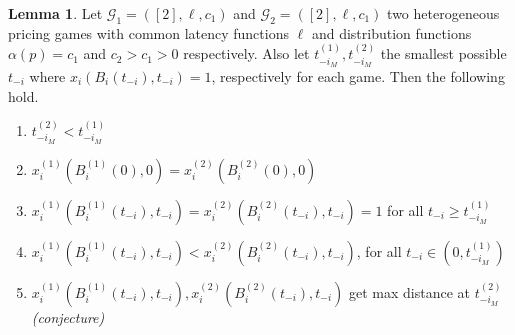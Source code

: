 \documentclass[10pt,a4paper]{book}
\newcommand{\Gm}{\mathcal{G}}
\theoremstyle{definition}
\newtheorem{lemma}[definition]{Lemma}
\theoremstyle{comment}
\begin{document}
\begin{lemma}
	\label{lemma:a_fixed_t_iM_fixed}
	Let $\Gm_1 = ([2], \ell, c_1)$ and $\Gm_2 = ([2], \ell, c_1)$ two heterogeneous pricing games with common latency functions $\ell$ and distribution functions $\alpha(p) = c_1$ and $c_2 > c_1 > 0$ respectively.
	Also let $t_{-i_M}^{(1)}, t_{-i_M}^{(2)}$ the smallest possible $t_{-i}$ where $x_i(B_i(t_{-i}), t_{-i}) = 1$, respectively for each game.
	Then the following hold.
	\begin{enumerate}[$(i)$]
		\item $t_{-i_M}^{(2)} < t_{-i_M}^{(1)}$
		\item $x_i^{(1)}(B_i^{(1)}(0), 0) = x_i^{(2)}(B_i^{(2)}(0), 0)$
		\item $x_i^{(1)}(B_i^{(1)}(t_{-i}), t_{-i}) = x_i^{(2)}(B_i^{(2)}(t_{-i}), t_{-i}) = 1$ for all $t_{-i} \ge t_{-i_M}^{(1)}$
		\item $x_i^{(1)}(B_i^{(1)}(t_{-i}), t_{-i}) < x_i^{(2)}(B_i^{(2)}(t_{-i}), t_{-i})$, for all $t_{-i} \in (0, t_{-i_M}^{(1)})$
		\item $x_i^{(1)}(B_i^{(1)}(t_{-i}), t_{-i}), x_i^{(2)}(B_i^{(2)}(t_{-i}), t_{-i})$ get max distance at $t_{-i_M}^{(2)}$ \\
		\textit{(conjecture)}
	\end{enumerate}
\end{lemma}
\end{document}

